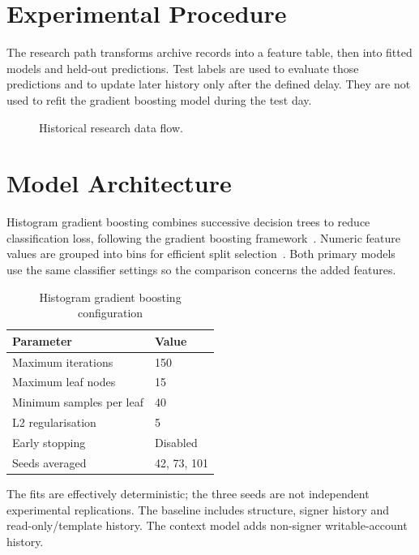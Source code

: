 \documentclass[12pt,a4paper,oneside]{report}
\begin{document}
\section{Experimental Procedure}
The research path transforms archive records into a feature table, then into fitted models and held-out predictions. Test labels are used to evaluate those predictions and to update later history only after the defined delay. They are not used to refit the gradient boosting model during the test day.
\begin{figure}[H]\centering
{}\caption{Historical research data flow.}\end{figure}

\section{Model Architecture}
Histogram gradient boosting combines successive decision trees to reduce classification loss, following the gradient boosting framework~\cite{friedman}. Numeric feature values are grouped into bins for efficient split selection~\cite{hgb}. Both primary models use the same classifier settings so the comparison concerns the added features.
\begin{table}[H]\centering\caption{Histogram gradient boosting configuration}
\begin{tabular}{ll}\toprule Parameter&Value\\\midrule Maximum iterations&150\\Maximum leaf nodes&15\\Minimum samples per leaf&40\\L2 regularisation&5\\Early stopping&Disabled\\Seeds averaged&42, 73, 101\\\bottomrule\end{tabular}\end{table}
The fits are effectively deterministic; the three seeds are not independent experimental replications. The baseline includes structure, signer history and read-only/template history. The context model adds non-signer writable-account history.
\end{document}
